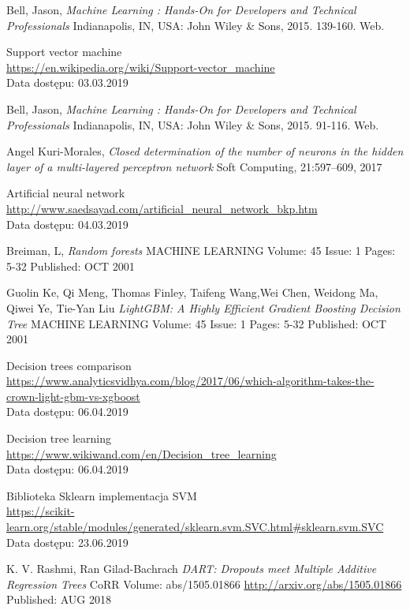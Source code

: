 \documentclass[a4paper, twoside, 11pt, openright]{article}
\begin{document}
\begin{thebibliography}{9}
	Bell, Jason, \textit{Machine Learning : Hands-On for Developers and Technical Professionals}  Indianapolis, IN, USA: John Wiley \& Sons, 2015. 139-160. Web.
	
	Support vector machine
	\\\url{https://en.wikipedia.org/wiki/Support-vector_machine} 
	\\Data dostępu: 03.03.2019

	Bell, Jason, \textit{Machine Learning : Hands-On for Developers and Technical Professionals}  Indianapolis, IN, USA: John Wiley \& Sons, 2015. 91-116. Web.


	Angel Kuri-Morales, 
  \textit{Closed determination of the number of neurons in the hidden layer of a multi-layered perceptron network}
  Soft Computing, 21:597–609, 2017

	Artificial neural network
	\\\url{http://www.saedsayad.com/artificial_neural_network_bkp.htm} 
	\\Data dostępu: 04.03.2019

	Breiman, L, 
  \textit{Random forests}
	MACHINE LEARNING  Volume: 45   Issue: 1   Pages: 5-32   Published: OCT 2001

Guolin Ke, Qi Meng, Thomas Finley, Taifeng Wang,Wei Chen, Weidong Ma, Qiwei Ye, Tie-Yan Liu
  \textit{LightGBM: A Highly Efficient Gradient Boosting Decision Tree}
	MACHINE LEARNING  Volume: 45   Issue: 1   Pages: 5-32   Published: OCT 2001



	Decision trees comparison
	\\\url{https://www.analyticsvidhya.com/blog/2017/06/which-algorithm-takes-the-crown-light-gbm-vs-xgboost} 
	\\Data dostępu: 06.04.2019


	Decision tree learning
	\\\url{https://www.wikiwand.com/en/Decision_tree_learning} 
	\\Data dostępu: 06.04.2019

	Biblioteka Sklearn implementacja SVM
	\\\url{https://scikit-learn.org/stable/modules/generated/sklearn.svm.SVC.html#sklearn.svm.SVC}
	\\Data dostępu: 23.06.2019

	K. V. Rashmi, Ran Gilad-Bachrach
	\textit{DART: Dropouts meet Multiple Additive Regression Trees}
	CoRR Volume: abs/1505.01866 \url{http://arxiv.org/abs/1505.01866} Published: AUG 2018

\end{thebibliography}
\end{document}
